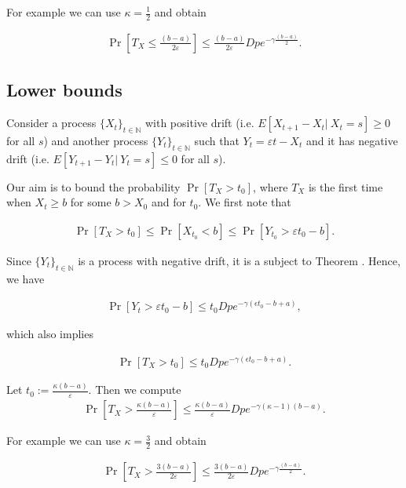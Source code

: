 \documentclass[12pt, a4paper]{article}
\theoremstyle{remark}
\begin{document}
For example we can use $\kappa = \frac{1}{2}$ and obtain

\begin{align*}
    \Pr\left[T_X \leq \frac{(b - a)}{2\varepsilon}\right] \leq \frac{(b - a)}{2\varepsilon} D p e^{-\gamma\frac{(b - a)}{2}}.
\end{align*}

\subsection{Lower bounds}

Consider a process $\{X_t\}_{t \in \mathbb{N}}$ with positive drift (i.e. $E[X_{t + 1} - X_t |\ X_t = s] \geq 0$ for all $s$) and another process $\{Y_t\}_{t \in \mathbb{N}}$ such that $Y_t = \varepsilon t - X_t$ and it has negative drift (i.e. $E[Y_{t + 1} - Y_t |\ Y_t = s] \leq 0$ for all $s$).

Our aim is to bound the probability $\Pr[T_X > t_0]$, where $T_X$ is the first time when $X_t \geq b$ for some $b > X_0$ and for $t_0$. We first note that

\begin{align*}
    \Pr[T_X > t_0] \leq \Pr[X_{t_0} < b] \leq \Pr[Y_{t_0} > \varepsilon t_0 - b].
\end{align*}

Since $\{Y_t\}_{t \in \mathbb{N}}$ is a process with negative drift, it is a subject to Theorem \cite{}. Hence, we have

\begin{align*}
    \Pr[Y_t > \varepsilon t_0 - b] \leq t_0 D p e^{-\gamma(\epsilon t_0 - b + a)},
\end{align*}

which also implies

\begin{align*}
    \Pr[T_X > t_0] \leq t_0 D p e^{-\gamma(\epsilon t_0 - b + a)}.
\end{align*}

Let $t_0 := \frac{\kappa (b - a)}{\varepsilon}$. Then we compute
\begin{align*}
    \Pr\left[T_X > \frac{\kappa (b - a)}{\varepsilon}\right] \leq \frac{\kappa (b - a)}{\varepsilon} D p e^{-\gamma(\kappa - 1)(b - a)}.
\end{align*}

For example we can use $\kappa = \frac{3}{2}$ and obtain

\begin{align*}
    \Pr\left[T_X > \frac{3 (b - a)}{2\varepsilon}\right] \leq \frac{3(b - a)}{2\varepsilon} D p e^{-\gamma\frac{(b - a)}{2}}.
\end{align*}
\end{document}

